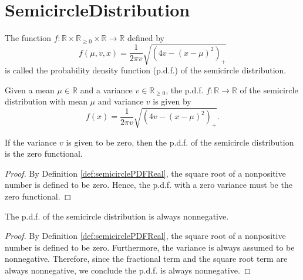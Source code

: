 \chapter{SemicircleDistribution}


\begin{definition}\label{def:semicirclePDFReal}
  \mathlibok 
    The function $f : \mathbb{R} \times \mathbb{R}_{\geq 0} \times \mathbb{R} \rightarrow \mathbb{R}$ defined by
   \[
    f(\mu,v,x) 
    = \frac{1}{2πv} \sqrt{(4v - (x - μ)^2)_+}
   \]
   is called the probability density function (p.d.f.) of the semicircle distribution.
\end{definition}
\begin{lemma}\label{lem:semicirclePDFReal_def}
  \mathlibok 
    Given a mean $\mu \in \mathbb{R}$ and a variance $v \in \mathbb{R}_{\geq 0}$, the p.d.f. $f : \mathbb{R} \rightarrow \mathbb{R}$ 
    of the semicircle distribution with mean $\mu$ and variance $v$ is given by
  \[
    f(x) = 
    \frac{1}{2πv} \sqrt{(4v - (x - μ)^2)_+}.
  \]
\end{lemma}
\begin{lemma}\label{lem:semicirclePDF_zero_var}
    \mathlibok
    If the variance $v$ is given to be zero, then the p.d.f. of the semicircle distribution is the zero functional.
\end{lemma}
\begin{proof}
    By Definition \ref{def:semicirclePDFReal}, the square root of a nonpositive number is defined to be zero.
    Hence, the p.d.f. with a zero variance must be the zero functional.
\end{proof}
\begin{lemma}\label{lem:semicirclePDF_nonneg}
    \mathlibok
    The p.d.f. of the semicircle distribution is always nonnegative. 
\end{lemma}
\begin{proof}
   By Definition \ref{def:semicirclePDFReal}, the square root of a nonpositive number is defined to be zero. 
   Furthermore, the variance is always assumed to be nonnegative.
   Therefore, since the fractional term and the square root term are always nonnegative,
   we conclude the p.d.f. is always nonnegative. 
\end{proof}
